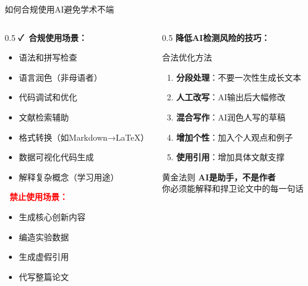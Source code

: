\documentclass[aspectratio=169,11pt]{beamer}
\begin{document}
\begin{frame}{如何合规使用AI避免学术不端}
    \begin{columns}
        \begin{column}{0.5\textwidth}
            \textbf{\textcolor{green!60!black}{\faCheck\ 合规使用场景：}}
            \begin{itemize}
                \item 语法和拼写检查
                \item 语言润色（非母语者）
                \item 代码调试和优化
                \item 文献检索辅助
                \item 格式转换（如Markdown→LaTeX）
                \item 数据可视化代码生成
                \item 解释复杂概念（学习用途）
            \end{itemize}
            
            \vspace{0.3cm}
            \textbf{\textcolor{red}{\faTimes\ 禁止使用场景：}}
            \begin{itemize}
                \item 生成核心创新内容
                \item 编造实验数据
                \item 生成虚假引用
                \item 代写整篇论文
            \end{itemize}
        \end{column}
        \begin{column}{0.5\textwidth}
            \textbf{降低AI检测风险的技巧：}
            \begin{block}{合法优化方法}
                \small
                \begin{enumerate}
                    \item \textbf{分段处理}：不要一次性生成长文本
                    \item \textbf{人工改写}：AI输出后大幅修改
                    \item \textbf{混合写作}：AI润色人写的草稿
                    \item \textbf{增加个性}：加入个人观点和例子
                    \item \textbf{使用引用}：增加具体文献支撑
                \end{enumerate}
            \end{block}
            
            \vspace{0.2cm}
            \begin{alertblock}{黄金法则}
                \centering
                \textbf{AI是助手，不是作者}\\
                \small
                你必须能解释和捍卫论文中的每一句话
            \end{alertblock}
        \end{column}
    \end{columns}
\end{frame}
\end{document}
